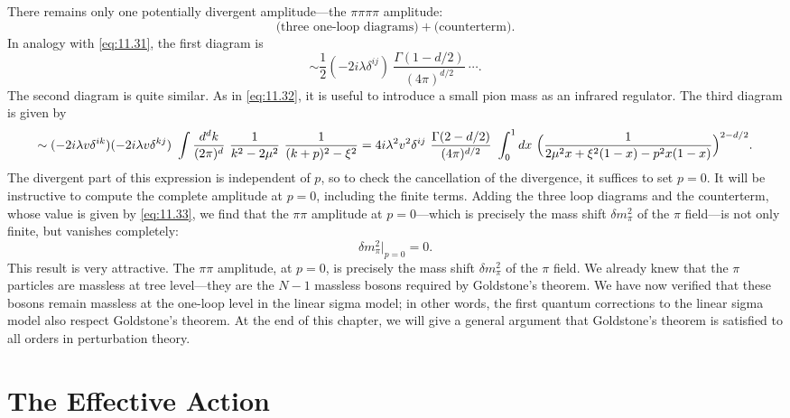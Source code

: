 There remains only one potentially divergent amplitude---the $\pi\pi\pi\pi$
amplitude:
\begin{equation}
  \text{(three one-loop diagrams)} + \text{(counterterm)} .
  \label{eq:11.37}
\end{equation}
In analogy with \eqref{eq:11.31}, the first diagram is
\begin{equation}
  \sim \frac{1}{2}(-2i\lambda\delta^{ij})\ \frac{\Gamma(1-d/2)}
    {(4\pi)^{d/2}}\ \cdots .
\end{equation}
The second diagram is quite similar.  As in \eqref{eq:11.32}, it is useful to
introduce a small pion mass as an infrared regulator.  The third diagram is
given by
\begin{equation}
  \sim (-2i\lambda v\delta^{ik})(-2i\lambda v\delta^{kj})\ \int
    \frac{d^dk}{(2\pi)^d}\ \frac{1}{k^2-2\mu^2}\ \frac{1}{(k+p)^2-\xi^2}
  = 4i\lambda^2v^2\delta^{ij}\ \frac{\Gamma(2-d/2)}{(4\pi)^{d/2}}\
    \int_0^1 dx\ \Bigl( \frac{1}{2\mu^2x + \xi^2(1-x) - p^2x(1-x)}
      \Bigr)^{2-d/2} .
  \label{eq:11.38}
\end{equation}
The divergent part of this expression is independent of $p$, so to check the
cancellation of the divergence, it suffices to set $p = 0$.  It will be
instructive to compute the complete amplitude at $p = 0$, including the
finite terms.  Adding the three loop diagrams and the counterterm, whose
value is given by \eqref{eq:11.33}, we find that the $\pi\pi$ amplitude at
$p = 0$---which is precisely the mass shift $\delta m_\pi^2$ of the $\pi$
field---is not only finite, but vanishes completely:
\begin{equation}
  \delta m_\pi^2 \Big|_{p=0} = 0 .
  \label{eq:11.39}
\end{equation}
This result is very attractive.  The $\pi\pi$ amplitude, at $p = 0$, is
precisely the mass shift $\delta m_\pi^2$ of the $\pi$ field.  We already knew
that the $\pi$ particles are massless at tree level---they are the $N-1$
massless bosons required by Goldstone's theorem.  We have now verified that
these bosons remain massless at the one-loop level in the linear sigma model;
in other words, the first quantum corrections to the linear sigma model also
respect Goldstone's theorem.  At the end of this chapter, we will give a
general argument that Goldstone's theorem is satisfied to all orders in
perturbation theory.

\section{The Effective Action}

